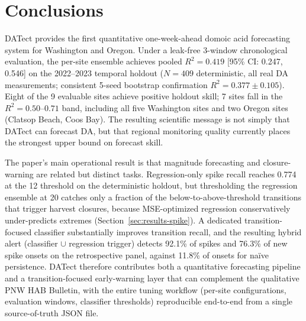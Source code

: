 \documentclass[toxins,article,submit,moreauthors]{Definitions/mdpi}
\begin{document}
\section{Conclusions}
\label{sec:conclusions}

DATect provides the first quantitative one-week-ahead domoic acid forecasting system for Washington and Oregon. Under a leak-free 3-window chronological evaluation, the per-site ensemble achieves pooled $R^2 = 0.419$ [95\% CI: 0.247, 0.546] on the 2022--2023 temporal holdout ($N = 409$ deterministic, all real DA measurements; consistent 5-seed bootstrap confirmation $R^2 = 0.377 \pm 0.105$). Eight of the 9 evaluable sites achieve positive holdout skill; 7 sites fall in the $R^2 = 0.50$--$0.71$ band, including all five Washington sites and two Oregon sites (Clatsop Beach, Coos Bay). The resulting scientific message is not simply that DATect can forecast DA, but that regional monitoring quality currently places the strongest upper bound on forecast skill.

The paper's main operational result is that magnitude forecasting and closure-warning are related but distinct tasks. Regression-only spike recall reaches 0.774 at the \SI{12}{\microgrampeg} threshold on the deterministic holdout, but thresholding the regression ensemble at \SI{20}{\microgrampeg} catches only a fraction of the below-to-above-threshold transitions that trigger harvest closures, because MSE-optimized regression conservatively under-predicts extremes (Section~\ref{sec:results-spike}). A dedicated transition-focused classifier substantially improves transition recall, and the resulting hybrid alert (classifier $\cup$ regression trigger) detects 92.1\% of spikes and 76.3\% of new spike onsets on the retrospective panel, against 11.8\% of onsets for na\"ive persistence. DATect therefore contributes both a quantitative forecasting pipeline and a transition-focused early-warning layer that can complement the qualitative PNW HAB Bulletin, with the entire tuning workflow (per-site configurations, evaluation windows, classifier thresholds) reproducible end-to-end from a single source-of-truth JSON file.


\vspace{6pt}
\end{document}
